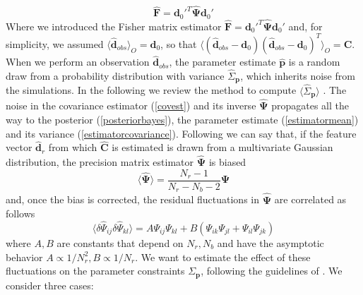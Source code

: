 \documentclass[reprint,aps,prd,superscriptaddress,showkeys,showpacs]{revtex4-1}
\newcommand{\bb}[1]{\mathbf{#1}}
\newcommand{\bbh}[1]{\mathbf{\hat{#1}}}
\newcommand{\h}[1]{\hat{#1}}
\begin{document}
\begin{equation}
\label{estimatorfisher}
\bbh{F} = \bb{d}_0'^T\bbh{\Psi}\bb{d}_0'
\end{equation}
%
Where we introduced the Fisher matrix estimator $\bbh{F} = \bb{d}_0'^T\bbh{\Psi}\bb{d}_0'$ and, for simplicity, we assumed $\langle\bbh{d}_{obs}\rangle_O=\bb{d}_0$, so that $\langle(\bbh{d}_{obs}-\bb{d}_0)(\bbh{d}_{obs}-\bb{d}_0)^T\rangle_O=\bb{C}$. 
When we perform an observation $\bbh{d}_{obs}$, the parameter estimate $\bbh{p}$ is a random draw from a probability distribution with variance $\h{\Sigma}_\bb{p}$, which inherits noise from the simulations. In the following we review the method to compute $\langle\h{\Sigma}_\bb{p}\rangle$ \citep{DodelsonSchneider13,Taylor12}. The noise in the covariance estimator (\ref{covest}) and its inverse $\bbh{\Psi}$ propagates all the way to the posterior (\ref{posteriorbayes}), the parameter estimate (\ref{estimatormean}) and its variance (\ref{estimatorcovariance}). Following \citep{Taylor12} we can say that, if the feature vector $\bbh{d}_r$ from which $\bbh{C}$ is estimated is drawn from a multivariate Gaussian distribution, the precision matrix estimator $\bbh{\Psi}$ is biased
\begin{equation}
\label{psibias}
\langle\bbh{\Psi}\rangle = \frac{N_r-1}{N_r-N_b-2}\bb{\Psi}
\end{equation}
%
and, once the bias is corrected, the residual fluctuations in $\bbh{\Psi}$ are correlated as follows
\begin{equation}
\label{psifluctuations}
\langle\delta\h{\Psi}_{ij}\delta\h{\Psi}_{kl}\rangle = A\Psi_{ij}\Psi_{kl} + B(\Psi_{ik}\Psi_{jl} + \Psi_{il}\Psi_{jk})
\end{equation}
%
where $A,B$ are constants that depend on $N_r,N_b$ and have the asymptotic behavior $A\propto1/N_r^2,B\propto1/N_r$. We want to estimate the effect of these fluctuations on the parameter constraints $\Sigma_\bb{p}$, following the guidelines of \citep{DodelsonSchneider13}. We consider three cases:
\end{document}
